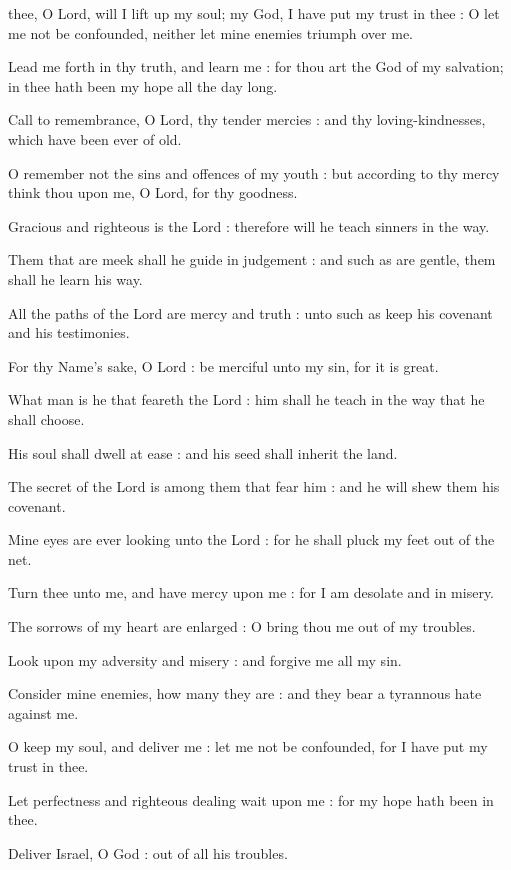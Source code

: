  thee, O Lord, will I lift up my soul; my God, I have put my trust in thee : O let me not be confounded, neither let mine enemies triumph over me.\par
{}
Lead me forth in thy truth, and learn me : for thou art the God of my salvation; in thee hath been my hope all the day long.\par
{}Call to remembrance, O Lord, thy tender mercies : and thy loving-kindnesses, which have been ever of old.\par
{}O remember not the sins and offences of my youth : but according to thy mercy think thou upon me, O Lord, for thy goodness.\par
{}Gracious and righteous is the Lord : therefore will he teach sinners in the way.\par
{}Them that are meek shall he guide in judgement : and such as are gentle, them shall he learn his way.\par
{}All the paths of the Lord are mercy and truth : unto such as keep his covenant and his testimonies.\par
{}For thy Name's sake, O Lord : be merciful unto my sin, for it is great.\par
{}What man is he that feareth the Lord : him shall he teach in the way that he shall choose.\par
{}His soul shall dwell at ease : and his seed shall inherit the land.\par
{}The secret of the Lord is among them that fear him : and he will shew them his covenant.\par
{}Mine eyes are ever looking unto the Lord : for he shall pluck my feet out of the net.\par
{}Turn thee unto me, and have mercy upon me : for I am desolate and in misery.\par
{}The sorrows of my heart are enlarged : O bring thou me out of my troubles.\par
{}Look upon my adversity and misery : and forgive me all my sin.\par
{}Consider mine enemies, how many they are : and they bear a tyrannous hate against me.\par
{}O keep my soul, and deliver me : let me not be confounded, for I have put my trust in thee.\par
{}Let perfectness and righteous dealing wait upon me : for my hope hath been in thee.\par
{}Deliver Israel, O God : out of all his troubles.\par

